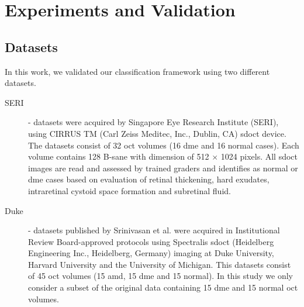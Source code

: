 
\section{Experiments and Validation }

\subsection{Datasets}

In this work, we validated our classification framework using two different datasets.

\begin{description}

\item[SERI]- datasets were acquired by Singapore Eye Research Institute (SERI), using CIRRUS TM (Carl Zeiss Meditec, Inc., Dublin, CA) \ac{sdoct} device. The datasets consist of 32 \ac{oct} volumes (16 \ac{dme} and 16 normal cases). Each volume contains 128 B-sane with  dimension of 512 $\times$ 1024 pixels.  All \ac{sdoct} images are read and assessed by trained graders and identifies as normal or \ac{dme} cases based on evaluation of retinal thickening, hard exudates, intraretinal cystoid space formation and subretinal fluid.

\item[Duke] - datasets published by Srinivasan et al. \cite{Srinivasan2014} were acquired in Institutional Review Board-approved protocols using Spectralis \ac{sdoct} (Heidelberg Engineering Inc., Heidelberg, Germany) imaging at Duke University, Harvard University and the University of Michigan. This datasets consist of 45 \ac{oct} volumes (15 \ac{amd}, 15 \ac{dme} and 15 normal). In this study we only consider a subset of the original data containing 15 \ac{dme} and 15 normal \ac{oct} volumes.

\end{description}

